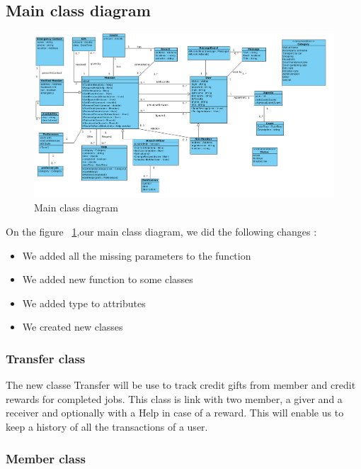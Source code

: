 \documentclass[11pt, a4paper]{article}   	%
\begin{document}
\subsection{Main class diagram}

\begin{figure}[!ht]
   \includegraphics[width=\textwidth]{phase3MainClassDiagram.png}
   \caption{\label{phase3MainClassDiagram} Main class diagram}
\end{figure}


On the figure ~\ref{phase3MainClassDiagram},our main class diagram, we did the following changes :

\begin{itemize}
\item We added all the missing parameters to the function
\item We added new function to some classes 
\item We added type to attributes
\item We created new classes
\end{itemize}

\subsubsection{Transfer class}

The new classe Transfer will be use to track credit gifts from member and credit rewards for completed jobs. This class is link with two member, a giver and a receiver and optionally with a Help in case of a reward. This will enable us to keep a history of all the transactions of a user.

\subsubsection{Member class}
\end{document}
